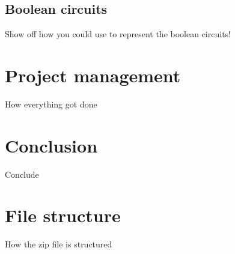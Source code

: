 \documentclass[11pt]{article}
\begin{document}
\subsection{Boolean circuits}
Show off how you could use to represent the boolean circuits!

\newpage

\section{Project management}
\label{sec:project-management}
How everything got done

\newpage
\section{Conclusion}
\label{sec:conclusion}
Conclude

\newpage



\newpage
\appendix

\section{File structure}
How the zip file is structured
\end{document}
